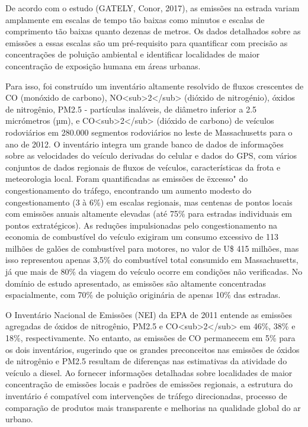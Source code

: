 De acordo com o estudo (GATELY, Conor, 2017), as emissões na estrada variam amplamente em escalas de 
tempo tão baixas como minutos e escalas de comprimento tão baixas quanto dezenas de metros. Os dados 
detalhados sobre as emissões a essas escalas são um pré-requisito para quantificar com precisão as 
concentrações de poluição ambiental e identificar localidades de maior concentração de exposição 
humana em áreas urbanas.

Para isso, foi construído um inventário altamente resolvido de fluxos crescentes de CO (monóxido de 
carbono), NO<sub>2</sub> (dióxido de nitrogénio), óxidos de nitrogênio, PM2.5 - partículas inaláveis, 
de diâmetro inferior a 2.5 micrómetros (µm), e CO<sub>2</sub> (dióxido de carbono) de veículos 
rodoviários em 280.000 segmentos rodoviários no leste de Massachusetts para o ano de 2012. O 
inventário integra um grande banco de dados de informações sobre as velocidades do veículo derivadas 
do celular e dados do GPS, com vários conjuntos de dados regionais de fluxos de veículos, 
características da frota e meteorologia local. Foram quantificadas as emissões de \"excesso" do 
congestionamento do tráfego, encontrando um aumento modesto do congestionamento (3 à 6\%) em escalas 
regionais, mas centenas de pontos locais com emissões anuais altamente elevadas (até 75\% para 
estradas individuais em pontos extratégicos). As reduções impulsionadas pelo congestionamento na 
economia de combustível do veículo exigiram um consumo excessivo de 113 milhões de galões de 
combustível para motores, no valor de U\$ 415 milhões, mas isso representou apenas 3,5\% do 
combustível total consumido em Massachusetts, já que mais de 80\% da viagem do veículo ocorre em 
condições não verificadas. No domínio de estudo apresentado, as emissões são altamente concentradas 
espacialmente, com 70\% de poluição originária de apenas 10\% das estradas. 

O Inventário Nacional de Emissões (NEI) da EPA de 2011 entende as emissões agregadas de óxidos de 
nitrogênio, PM2.5 e CO<sub>2</sub> em 46\%, 38\% e 18\%, respectivamente. No entanto, as emissões de 
CO permanecem em 5\% para os dois inventários, sugerindo que os grandes preconceitos nas emissões de 
óxidos de nitrogênio e PM2.5 resultam de diferenças nas estimativas da atividade do veículo a diesel. 
Ao fornecer informações detalhadas sobre localidades de maior concentração de emissões locais e 
padrões de emissões regionais, a estrutura do inventário é compatível com intervenções de tráfego 
direcionadas, processo de comparação de produtos mais transparente e melhorias na qualidade global 
do ar urbano.

